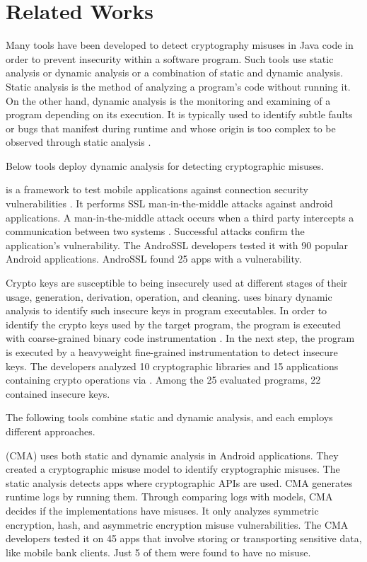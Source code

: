 \chapter{Related Works}
\label{ch:relatedwork}

Many tools have been developed to detect cryptography misuses in Java code in order to prevent insecurity within a software program. Such tools use static analysis or dynamic analysis or a combination of static and dynamic analysis. Static analysis is the method of analyzing a program's code without running it. On the other hand, dynamic analysis is the monitoring and examining of a program depending on its execution. It is typically used to identify subtle faults or bugs that manifest during runtime and whose origin is too complex to be observed through static analysis \cite{cx16}.

Below tools deploy dynamic analysis for detecting cryptographic misuses.

\androssl{} is a framework to test mobile applications against connection security vulnerabilities \cite{androssl15}. It performs SSL man-in-the-middle attacks against android applications. A man-in-the-middle attack occurs when a third party intercepts a communication between two systems \cite{mitm19}. Successful attacks confirm the application's vulnerability. The AndroSSL developers tested it with 90 popular Android applications. AndroSSL found 25 apps with a vulnerability.


Crypto keys are susceptible to being insecurely used at different stages of their usage, generation, derivation, operation, and cleaning. \khunt{} \cite{khunt18} uses binary dynamic analysis to identify such insecure keys in program executables. In order to identify the crypto keys used by the target program, the program is executed with coarse-grained binary code instrumentation \cite{khunt18}. In the next step, the program is executed by a heavyweight fine-grained instrumentation \cite{khunt18} to detect insecure keys. The \khunt{} developers analyzed 10 cryptographic libraries and 15 applications containing crypto operations via \khunt. Among the 25 evaluated programs, 22 contained insecure keys.



The following tools combine static and dynamic analysis, and each employs different approaches. 


\cma{} (CMA) \cite{cma14} uses both static and dynamic analysis in Android applications. They created a cryptographic misuse model to identify cryptographic misuses. The static analysis detects apps where cryptographic APIs are used. CMA generates runtime logs by running them. Through comparing logs with models, CMA decides if the implementations have misuses. It only analyzes symmetric encryption, hash, and asymmetric encryption misuse vulnerabilities. The CMA developers tested it on 45 apps that involve storing or transporting sensitive data, like mobile bank clients. Just 5 of them were found to have no misuse.


